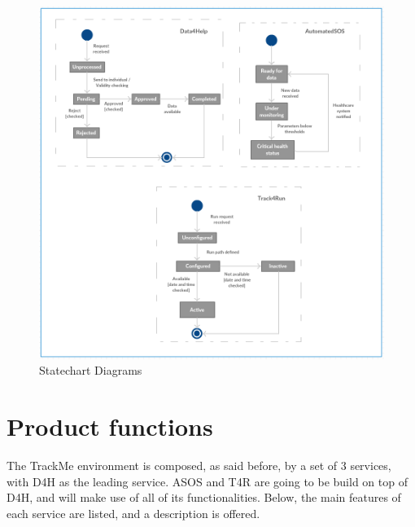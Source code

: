 \documentclass[12pt]{report}
\begin{document}
 \begin{figure}[H]
\centering
 \includegraphics[scale=0.6]{Diagrams/statechart_diagrams.png}
\caption[Statechart Diagrams]{Statechart Diagrams}
\label{fig:Statechart_diagram}
\end{figure}

\section{Product functions}
The TrackMe environment is composed, as said before, by a set of 3 services, with D4H as the leading service. ASOS and T4R are going to be build on top of D4H, and will make use of all of its functionalities. Below, the main features of each service are listed, and a description is offered.
\end{document}
